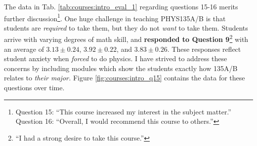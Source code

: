 \documentclass[../../main.tex]{subfiles}
\begin{document}
The data in Tab. \ref{tab:courses:intro_eval_1} regarding questions 15-16 merits further discussion\footnote{Question 15: ``This course increased my interest in the subject matter.'' Question 16: ``Overall, I would recommend this course to others.''}.  One huge challenge in teaching PHYS135A/B is that students are \textit{required} to take them, but they  do not \textit{want} to take them.  Students arrive with varying degrees of math skill, and \textbf{responded to Question 9}\footnote{``I had a strong desire to take this course.''} with an average of $3.13 \pm 0.24$, $3.92 \pm 0.22$, and $3.83 \pm 0.26$.  These responses reflect student anxiety when \textit{forced} to do physics.  I have strived to address these concerns by including modules which show the students exactly how 135A/B relates to \textit{their major.} Figure \ref{fig:courses:intro_q15} contains the data for these questions over time. \\ \hspace{0.1cm}
\end{document}
